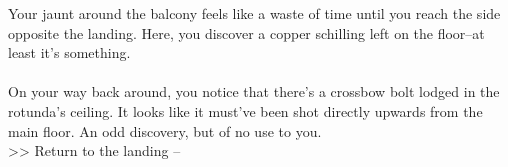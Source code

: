 Your jaunt around the balcony feels like a waste of time until you reach the side opposite the landing. Here, you discover a copper schilling left on the floor--at least it's something.\\
\\

On your way back around, you notice that there's a crossbow bolt lodged in the rotunda's ceiling. It looks like it must've been shot directly upwards from the main floor. An odd discovery, but of no use to you.\\

>> Return to the landing -- 